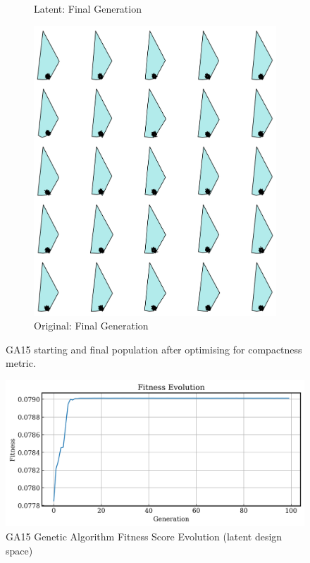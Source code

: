 \documentclass{article}
\begin{document}
\begin{figure}[H]
\begin{subfigure}[b]{0.32\textwidth}
        \caption{Latent: Final Generation}
        \label{fig:GA15_latent_final}
    \end{subfigure}
    \hfill
    \begin{subfigure}[b]{0.32\textwidth}
        \centering
        \includegraphics[width=\textwidth]{figures/GAResults/GA15/original/original_final_gen.png}
        \caption{Original: Final Generation}
        \label{fig:GA15_origina_final}
    \end{subfigure}
    \caption{GA15 starting and final population after optimising for compactness metric.}
    \label{fig:GA15_before_after_GA}
\end{figure}

\begin{figure}[H]
    \centering
    \includegraphics[width=0.75\linewidth]{figures/GAResults/GA15/latent/100gens_10pars_5pcentmut.png}
    \caption{GA15 Genetic Algorithm Fitness Score Evolution (latent design space)}
    \label{fig:GA15_fitness_latent}
\end{figure}
\end{document}

